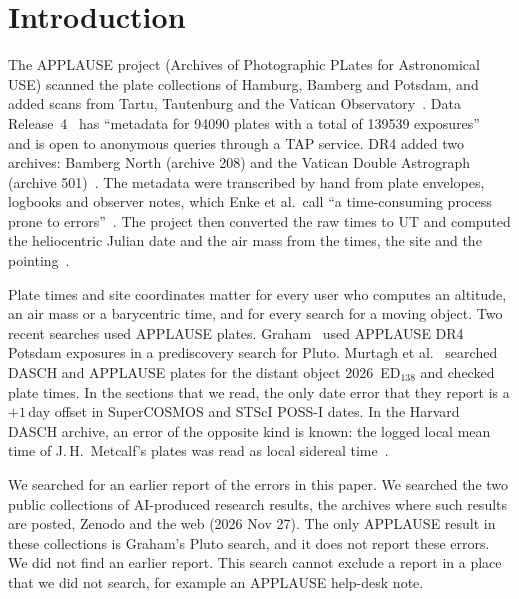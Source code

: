 \documentclass[11pt]{article}
\begin{document}
\section{Introduction}
The APPLAUSE project (Archives of Photographic PLates for Astronomical USE) scanned the plate collections of Hamburg, Bamberg and Potsdam, and added scans from Tartu, Tautenburg and the Vatican Observatory~\cite{enke2024}. Data Release~4~\cite{dr4} has ``metadata for 94090 plates with a total of 139539 exposures''~\cite{dr4doc} and is open to anonymous queries through a TAP service. DR4 added two archives: Bamberg North (archive 208) and the Vatican Double Astrograph (archive 501)~\cite{dr4new}. The metadata were transcribed by hand from plate envelopes, logbooks and observer notes, which Enke et al.\ call ``a time-consuming process prone to errors''~\cite{enke2024}. The project then converted the raw times to UT and computed the heliocentric Julian date and the air mass from the times, the site and the pointing~\cite{enke2024}.

Plate times and site coordinates matter for every user who computes an altitude, an air mass or a barycentric time, and for every search for a moving object. Two recent searches used APPLAUSE plates. Graham~\cite{graham2026} used APPLAUSE DR4 Potsdam exposures in a prediscovery search for Pluto. Murtagh et al.~\cite{murtagh2026} searched DASCH and APPLAUSE plates for the distant object 2026~ED$_{138}$ and checked plate times. In the sections that we read, the only date error that they report is a $+1$\,day offset in SuperCOSMOS and STScI POSS-I dates. In the Harvard DASCH archive, an error of the opposite kind is known: the logged local mean time of J.\,H.~Metcalf's plates was read as local sidereal time~\cite{wu2026metcalf}.

We searched for an earlier report of the errors in this paper. We searched the two public collections of AI-produced research results, the archives where such results are posted, Zenodo and the web (2026 Nov 27). The only APPLAUSE result in these collections is Graham's Pluto search, and it does not report these errors. We did not find an earlier report. This search cannot exclude a report in a place that we did not search, for example an APPLAUSE help-desk note.
\end{document}
